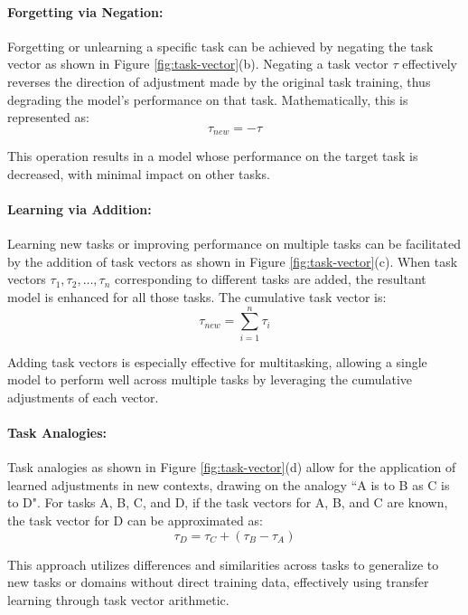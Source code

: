 \paragraph{Forgetting via Negation:} Forgetting or unlearning a specific task can be achieved by negating the task vector as shown in Figure \ref{fig:task-vector}(b). Negating a task vector \( \tau \) effectively reverses the direction of adjustment made by the original task training, thus degrading the model's performance on that task. Mathematically, this is represented as:
\begin{equation}
	\tau_{new} = -\tau
\end{equation}

This operation results in a model whose performance on the target task is decreased, with minimal impact on other tasks.

\paragraph{Learning via Addition:} Learning new tasks or improving performance on multiple tasks can be facilitated by the addition of task vectors as shown in Figure \ref{fig:task-vector}(c). When task vectors \( \tau_1, \tau_2, \ldots, \tau_n \) corresponding to different tasks are added, the resultant model is enhanced for all those tasks. The cumulative task vector is:
\begin{equation}
	\tau_{new} = \sum_{i=1}^n \tau_i
\end{equation}

Adding task vectors is especially effective for multitasking, allowing a single model to perform well across multiple tasks by leveraging the cumulative adjustments of each vector.

\paragraph{Task Analogies:} Task analogies as shown in Figure \ref{fig:task-vector}(d)  allow for the application of learned adjustments in new contexts, drawing on the analogy ``A is to B as C is to D". For tasks A, B, C, and D, if the task vectors for A, B, and C are known, the task vector for D can be approximated as:
\begin{equation}
\tau_D = \tau_C + (\tau_B - \tau_A)
\end{equation}

This approach utilizes differences and similarities across tasks to generalize to new tasks or domains without direct training data, effectively using transfer learning through task vector arithmetic.

